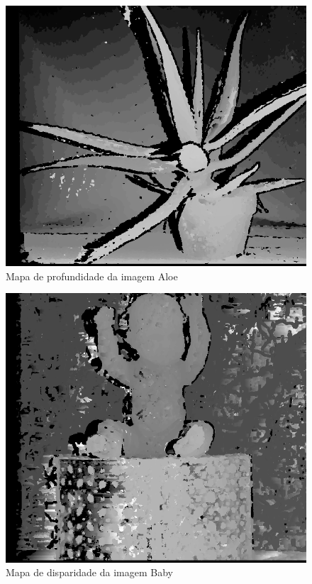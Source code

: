 \documentclass[conference]{IEEEtran}
\begin{document}
\begin{figure}[ht!]\label{aloeDepth}
\begin{center}
\includegraphics[width= .85\columnwidth]{aloeDepth.png}
\caption{Mapa de profundidade da imagem Aloe}
\end{center}
\end{figure}

\begin{figure}[ht!]\label{babyDisp}
\begin{center}
\includegraphics[width= .85\columnwidth]{babyDisp.png}
\caption{Mapa de disparidade da imagem Baby}
\end{center}
\end{figure}
\end{document}
